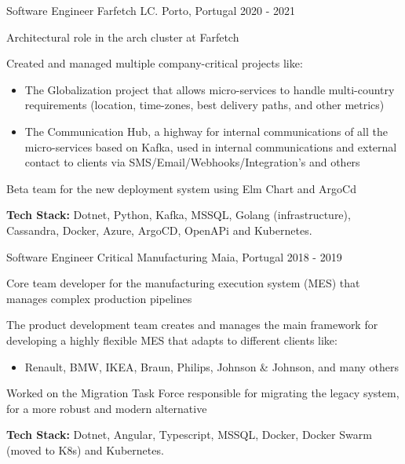 \begin{cventries}
\cventry
  {Software Engineer} %
  {Farfetch LC.} %
  {Porto, Portugal} %
  {2020 - 2021} %
  {
    \begin{cvitems} %
      \item {Architectural role in the arch cluster at Farfetch}
      \item {Created and managed multiple company-critical projects like:}
      \begin{itemize}
       \item The Globalization project that allows micro-services to handle multi-country requirements (location, time-zones, best delivery paths, and other metrics)
       \item The Communication Hub, a highway for internal communications of all the micro-services based on Kafka, used in internal communications and external contact to clients via SMS/Email/Webhooks/Integration's and others
      \end{itemize}
      \item Beta team for the new deployment system using Elm Chart and ArgoCd
      \item {\textbf{Tech Stack:} Dotnet, Python, Kafka, MSSQL, Golang (infrastructure), Cassandra, Docker, Azure, ArgoCD, OpenAPi and Kubernetes.}
    \end{cvitems}
  }

  
    \cventry
      {Software Engineer} %
      {Critical Manufacturing} %
      {Maia, Portugal} %
      {2018 - 2019} %
      {
        \begin{cvitems} %
          \item {Core team developer for the manufacturing execution system (MES) that manages complex production pipelines}
          \item {The product development team creates and manages the main framework for
  developing a highly flexible MES that adapts to different clients like:}
          \begin{itemize}
           \item Renault, BMW, IKEA, Braun, Philips, Johnson \& Johnson, and many others 
          \end{itemize}
          \item Worked on the Migration Task Force responsible for migrating the legacy system, for a more robust and modern alternative
          \item {\textbf{Tech Stack:} Dotnet, Angular, Typescript, MSSQL, Docker, Docker Swarm (moved to K8s) and Kubernetes.}
        \end{cvitems}
      }
  

\end{cventries}
